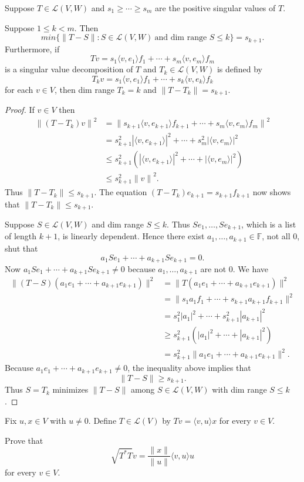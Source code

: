 \documentclass{scrartcl}
\begin{document}
\begin{definition}
  Suppose $T \in \mathcal{L}(V,W)$ and $s_1 \geq \cdots \geq s_m$ are the positive singular values of $T$.

  Suppose $1 \le k < m$. Then
  \[
    min\{ \| T-S\| :S \in \mathcal{L}(V,W)\ \text{and dim range } S \le k\} = s_{k+1}.
  \]
  Furthermore, if
  \[
    Tv = s_1\langle v,e_1\rangle f_1 + \cdots + s_m\langle v,e_m\rangle f_m
  \]
  is a singular value decomposition of $T$ and $T_k \in \mathcal{L}(V,W)$ is defined by
  \[
    T_k v = s_1\langle v,e_1\rangle f_1 + \cdots + s_k\langle v,e_k\rangle f_k
  \]
  for each $v\in V$, then dim range $T_k = k$ and $\| T-T_k\| = s_{k+1}$.
\end{definition}
\begin{proof}
  If $v \in V$ then
\begin{align*}
{\|(T-T_k)v\|}^2 &= {\|s_{k+1}\langle v,e_{k+1}\rangle f_{k+1}+\cdots +s_m\langle v,e_m\rangle f_m \|}^2 \\
               &= s_{k+1}^2{|\langle v,e_{k+1}\rangle |}^2 +\cdots +s_m^2{|\langle v,e_m\rangle |}^2 \\
               &\le s_{k+1}^2\left( {|\langle v,e_{k+1}\rangle |}^2+\cdots + {|\langle v,e_m\rangle |}^2\right) \\
               &\le s_{k+1}^2{\|v\|}^2.
\end{align*}
Thus $\|T-T_k\| \le s_{k+1}$. The equation $(T-T_k)e_{k+1} = s_{k+1}f_{k+1}$ now shows that $\|T-T_k\| \le s_{k+1}$.

  Suppose $S \in \mathcal{L}(V,W)$ and dim range $S \le k$. Thus $Se_1,\ldots ,Se_{k+1}$, which is a list of length $k + 1$, is linearly dependent. Hence there exist $a_1,\ldots ,a_{k+1} \in \mathbb{F}$, not all 0, shut that
\[
  a_1Se_1 + \cdots + a_{k+1}Se_{k+1} = 0.
\]
Now $a_1Se_1 + \cdots + a_{k+1}Se_{k+1} \ne 0$ because $a_1,\ldots ,a_{k+1}$ are not 0. We have
\begin{align*}
\|(T - S)(a_1 e_1 + \cdots + a_{k+1} e_{k+1})\|^2 
  &= \|T(a_1 e_1 + \cdots + a_{k+1} e_{k+1})\|^2 \\
  &= \|s_1 a_1 f_1 + \cdots + s_{k+1} a_{k+1} f_{k+1}\|^2 \\
  &= s_1^2 |a_1|^2 + \cdots + s_{k+1}^2 |a_{k+1}|^2 \\
  &\ge s_{k+1}^2 (|a_1|^2 + \cdots + |a_{k+1}|^2) \\
  &= s_{k+1}^2 \|a_1 e_1 + \cdots + a_{k+1} e_{k+1}\|^2.
\end{align*}
Because $a_1e_1 + \cdots + a_{k+1}e_{k+1} \ne 0$, the inequality above implies that
\[
  \|T-S\| \ge s_{k+1}.
\]
Thus $S = T_k$ minimizes $\|T-S\|$ among $S \in \mathcal{L}(V,W)$ with dim range $S \le k$.
\end{proof}
\begin{problem}
  Fix $u,x \in V$ with $u \ne 0$. Define $T \in \mathcal{L}(V)$ by $Tv = \langle v,u\rangle x$ for every $v \in V$.

  Prove that
  \[
  \sqrt{T^*T}v = \frac{\|x\|}{\|u\|}\langle v,u\rangle u
  \]
  for every $v \in V$.
\end{problem}
\end{document}
